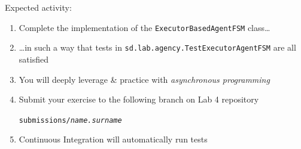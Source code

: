 \documentclass[presentation]{beamer}\mode<presentation>{\usetheme{AMSCesenaPurpleAndGold}}
\newcommand{\labN}{4}
\begin{document}
\begin{frame}[c, allowframebreaks]
    \framebreak

    Expected activity:
    \bigskip
    \begin{enumerate}

        \item Complete the implementation of the \texttt{ExecutorBasedAgentFSM} class\ldots

        \bigskip

        \item \ldots in such a way that tests in \texttt{sd.lab.agency.\alert{TestExecutorAgentFSM}} are all satisfied

        \bigskip

        \item You will deeply leverage \& practice with \emph{asynchronous programming}

        \bigskip

        \item Submit your exercise to the following branch on Lab \labN{} repository
        \begin{center}
            \texttt{submissions/\textit{name.surname}}
        \end{center}

        \bigskip

        \item Continuous Integration will automatically run tests
    \end{enumerate}

\end{frame}

\section*{}

\frame{\titlepage}
\end{document}
